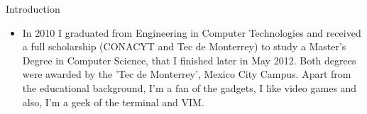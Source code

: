 \documentclass[calibri]{../macdowell-cv/mcdowellcv}
\begin{document}
	\makeheader
	
	\begin{cvsection}{Introduction}
		\begin{cvsubsection}{}{}{}
			\begin{itemize}
					\item In 2010 I graduated from Engineering in Computer Technologies and received a full scholarship (CONACYT and Tec de Monterrey) to study a Master’s Degree in Computer Science, that I finished later in May 2012. Both degrees were awarded by the ’Tec de Monterrey’, Mexico City Campus. Apart from the educational background, I’m a fan of the gadgets, I like video games and also, I’m a geek of the terminal and VIM.
			\end{itemize}
		\end{cvsubsection}
	\end{cvsection}
\end{document}
